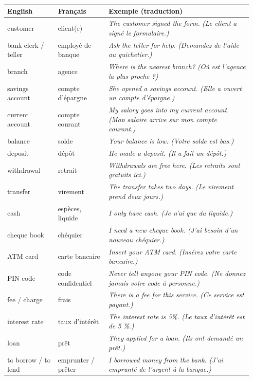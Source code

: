 \documentclass[11pt]{article}
\newcommand{\eng}[1]{\ifmmode\text{\textit{#1}}\else\begingroup\selectlanguage{english}\itshape #1\endgroup\fi}
\begin{document}
\begin{center}
\begin{tabularx}{\linewidth}{|l|X|X|}
\hline
\rowcolor{popblueL} \textbf{English} & \textbf{Français} & \textbf{Exemple (traduction)} \\
\hline
customer & client(e) & \eng{The customer signed the form.} (Le client a signé le formulaire.) \\
\hline
bank clerk / teller & employé de banque & \eng{Ask the teller for help.} (Demandez de l'aide au guichetier.) \\
\hline
branch & agence & \eng{Where is the nearest branch?} (Où est l'agence la plus proche ?) \\
\hline
savings account & compte d'épargne & \eng{She opened a savings account.} (Elle a ouvert un compte d'épargne.) \\
\hline
current account & compte courant & \eng{My salary goes into my current account.} (Mon salaire arrive sur mon compte courant.) \\
\hline
balance & solde & \eng{Your balance is low.} (Votre solde est bas.) \\
\hline
deposit & dépôt & \eng{He made a deposit.} (Il a fait un dépôt.) \\
\hline
withdrawal & retrait & \eng{Withdrawals are free here.} (Les retraits sont gratuits ici.) \\
\hline
transfer & virement & \eng{The transfer takes two days.} (Le virement prend deux jours.) \\
\hline
cash & espèces, liquide & \eng{I only have cash.} (Je n'ai que du liquide.) \\
\hline
cheque book & chéquier & \eng{I need a new cheque book.} (J'ai besoin d'un nouveau chéquier.) \\
\hline
ATM card & carte bancaire & \eng{Insert your ATM card.} (Insérez votre carte bancaire.) \\
\hline
PIN code & code confidentiel & \eng{Never tell anyone your PIN code.} (Ne donnez jamais votre code à personne.) \\
\hline
fee / charge & frais & \eng{There is a fee for this service.} (Ce service est payant.) \\
\hline
interest rate & taux d'intérêt & \eng{The interest rate is 5\%.} (Le taux d'intérêt est de 5 \%.) \\
\hline
loan & prêt & \eng{They applied for a loan.} (Ils ont demandé un prêt.) \\
\hline
to borrow / to lend & emprunter / prêter & \eng{I borrowed money from the bank.} (J'ai emprunté de l'argent à la banque.) \\
\hline
\end{tabularx}
\end{center}
\end{document}
